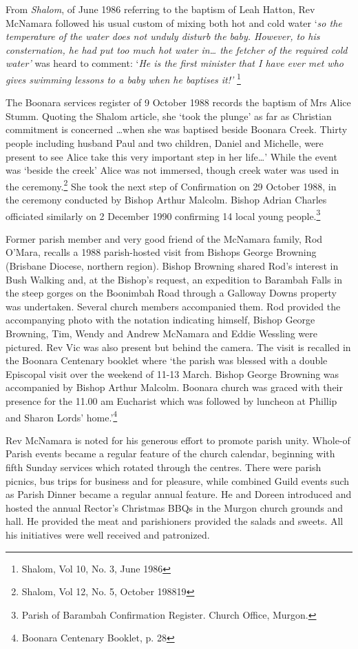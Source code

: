 From \emph{Shalom}, of June 1986 referring to the baptism of Leah Hatton, Rev McNamara followed his usual custom of mixing both hot and cold water `\emph{so the temperature of the water does not unduly disturb the baby. However, to his consternation, he had put too much hot water in\ldots{} the fetcher of the required cold water'} was heard to comment: `\emph{He is the first minister that I have ever met who gives swimming lessons to a baby when he baptises it!'} \footnote{Shalom, Vol 10, No. 3, June 1986}

The Boonara services register of 9 October 1988 records the baptism of Mrs Alice Stumm. Quoting the Shalom article, she `took the plunge' as far as Christian commitment is concerned \ldots when she was baptised beside Boonara Creek. Thirty people including husband Paul and two children, Daniel and Michelle, were present to see Alice take this very important step in her life\ldots' While the event was `beside the creek' Alice was not immersed, though creek water was used in the ceremony.\footnote{Shalom, Vol 12, No. 5, October 198819} She took the next step of Confirmation on 29 October 1988, in the ceremony conducted by Bishop Arthur Malcolm. Bishop Adrian Charles officiated similarly on 2 December 1990 confirming 14 local young people.\footnote{Parish of Barambah Confirmation Register. Church Office, Murgon.}

Former parish member and very good friend of the McNamara family, Rod O'Mara, recalls a 1988 parish-hosted visit from Bishops George Browning (Brisbane Diocese, northern region). Bishop Browning shared Rod's interest in Bush Walking and, at the Bishop's request, an expedition to Barambah Falls in the steep gorges on the Boonimbah Road through a Galloway Downs property was undertaken. Several church members accompanied them. Rod provided the accompanying photo with the notation indicating himself, Bishop George Browning, Tim, Wendy and Andrew McNamara and Eddie Wessling were pictured. Rev Vic was also present but behind the camera. The visit is recalled in the Boonara Centenary booklet where `the parish was blessed with a double Episcopal visit over the weekend of 11-13 March. Bishop George Browning was accompanied by Bishop Arthur Malcolm. Boonara church was graced with their presence for the 11.00 am Eucharist which was followed by luncheon at Phillip and Sharon Lords' home.'\footnote{Boonara Centenary Booklet, p. 28}

Rev McNamara is noted for his generous effort to promote parish unity. Whole-of Parish events became a regular feature of the church calendar, beginning with fifth Sunday services which rotated through the centres. There were parish picnics, bus trips for business and for pleasure, while combined Guild events such as Parish Dinner became a regular annual feature. He and Doreen introduced and hosted the annual Rector's Christmas BBQs in the Murgon church grounds and hall. He provided the meat and parishioners provided the salads and sweets. All his initiatives were well received and patronized.

